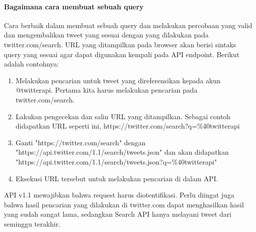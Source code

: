 \paragraph{Bagaimana cara membuat sebuah query}
Cara berbaik dalam membuat sebuah query dan melakukan percobaan yang valid dan mengembalikan tweet yang sesuai dengan yang dilakukan pada twitter.com/search. URL yang ditampilkan pada browser akan berisi sintaks query yang sesuai agar dapat digunakan kempali pada API endpoint. Berikut adalah contohnya:

\begin{enumerate}
	\item Melakukan pencarian untuk tweet yang direferensikan kepada akun @twitterapi. Pertama kita harus melakukan pencarian pada twitter.com/search.
	\item Lakukan pengecekan dan salin URL yang ditampilkan. Sebagai contoh didapatkan URL seperti ini, https://twitter.com/search?q=\%40twitterapi
	\item Ganti "https://twitter.com/search" dengan "https://api.twitter.com/1.1/search/tweets.json" dan akan didapatkan "https://api.twitter.com/1.1/search/tweets.json?q=\%40twitterapi"
	\item Eksekusi URL tersebut untuk melakukan pencarian di dalam API.
\end{enumerate}

API v1.1 mewajibkan bahwa request harus diotentifikasi. Perlu diingat juga bahwa hasil pencarian yang dilakukan di twitter.com dapat menghasilkan hasil yang sudah sangat lama, sedangkan Search API hanya melayani tweet dari seminggu terakhir.

